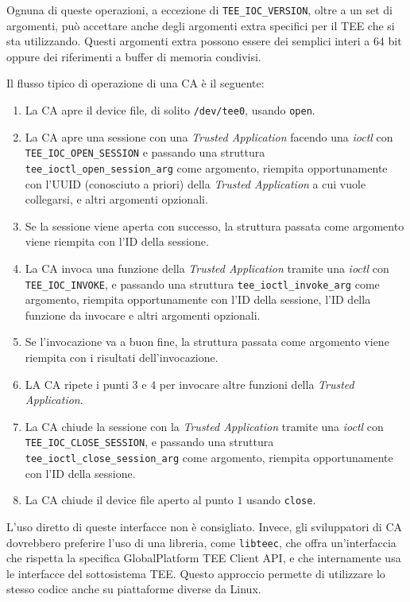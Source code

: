 \documentclass[12pt,italian]{report}
\begin{document}
Ognuna di queste operazioni, a eccezione di \texttt{TEE\_IOC\_VERSION},
oltre a un set di argomenti, può accettare anche degli argomenti extra
specifici per il TEE che si sta utilizzando.
Questi argomenti extra possono essere dei semplici interi a $64$ bit oppure
dei riferimenti a buffer di memoria condivisi.

Il flusso tipico di operazione di una CA è il seguente:
\begin{enumerate}
    \item La CA apre il device file, di solito \texttt{/dev/tee0}, usando
        \texttt{open}.
    \item La CA apre una sessione con una \textit{Trusted Application}
        facendo una \textit{ioctl} con \texttt{TEE\_IOC\_OPEN\_SESSION}
        e passando una struttura \texttt{tee\_ioctl\_open\_session\_arg}
        come argomento, riempita opportunamente con l'UUID
        (conosciuto a priori) 
        della \textit{Trusted Application} a cui vuole collegarsi, 
        e altri argomenti opzionali.
    \item Se la sessione viene aperta con successo, la struttura passata come
        argomento viene riempita con l'ID della sessione.
    \item La CA invoca una funzione della \textit{Trusted Application} tramite
        una \textit{ioctl} con \texttt{TEE\_IOC\_INVOKE}, e passando una
        struttura \texttt{tee\_ioctl\_invoke\_arg} come argomento, riempita
        opportunamente con l'ID della sessione, l'ID della funzione da
        invocare e altri argomenti opzionali.
    \item Se l'invocazione va a buon fine, la struttura passata come argomento
        viene riempita con i risultati dell'invocazione.
    \item LA CA ripete i punti $3$ e $4$ per invocare altre funzioni della
        \textit{Trusted Application}.
    \item La CA chiude la sessione con la \textit{Trusted Application} tramite
        una \textit{ioctl} con \texttt{TEE\_IOC\_CLOSE\_SESSION}, e passando
        una struttura \texttt{tee\_ioctl\_close\_session\_arg} come argomento,
        riempita opportunamente con l'ID della sessione.
    \item La CA chiude il device file aperto al punto $1$ usando \texttt{close}.
\end{enumerate}

\bigbreak \noindent

L'uso diretto di queste interfacce non è consigliato.
Invece, gli sviluppatori di CA dovrebbero preferire l'uso di una libreria, come
\texttt{libteec}, che offra un'interfaccia che rispetta la specifica
GlobalPlatform TEE Client API\cite{gp2020internalapi},
e che internamente usa
le interfacce del sottosistema TEE.
Questo approccio permette di utilizzare lo stesso codice anche su
piattaforme diverse da Linux.
\end{document}
